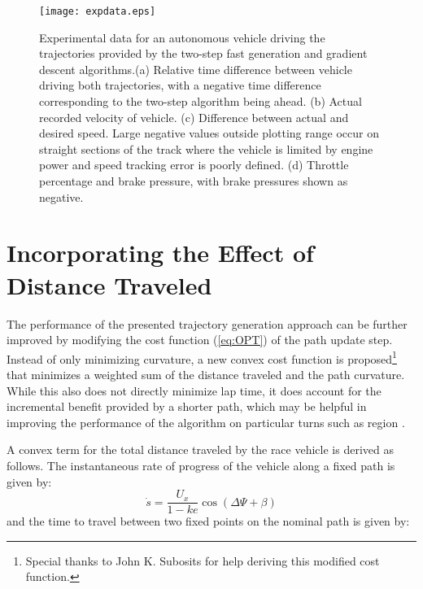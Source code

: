  \begin{figure}[tb]
\centering
\texttt{[image: expdata.eps]}
\caption[Experimental data for an autonomous vehicle driving the trajectories provided by the two-step fast generation and gradient descent algorithms.]{Experimental data for an autonomous vehicle driving the trajectories provided by the two-step fast generation and gradient descent algorithms.(a) Relative time difference
between vehicle driving both trajectories, with a negative time difference corresponding to the two-step algorithm being ahead. (b) Actual
recorded velocity of vehicle. (c) Difference between actual and desired speed. Large negative values outside plotting range occur 
 on straight sections of the track where the vehicle is limited by engine power and speed tracking error is poorly defined. (d) Throttle percentage and brake pressure, with brake pressures shown as negative.  }
\label{fig:expdata}
\end{figure}

\section{Incorporating the Effect of Distance Traveled}
\label{sec:ADDMINDIST}
The performance of the presented trajectory generation approach can be further improved by modifying the cost function (\ref{eq:OPT})
of the path update step. Instead of only minimizing curvature, a new convex cost function is proposed\footnote{Special thanks to John K. Subosits for help deriving this modified cost function.} that minimizes a weighted
sum of the distance traveled and the path curvature. While this also does not directly minimize lap time, it does account for the incremental benefit provided by a shorter
path, which may be helpful in improving the performance of the algorithm on particular turns such as region .

A convex term for the total distance traveled by the race vehicle is derived as follows. The instantaneous rate of
 progress of the vehicle along a fixed path is given by:
\begin{equation}
	\dot{s} = \frac{U_x}{1-ke}\cos(\Delta\Psi + \beta)
\end{equation}
and the time to travel between two fixed points on the nominal path is given by:

